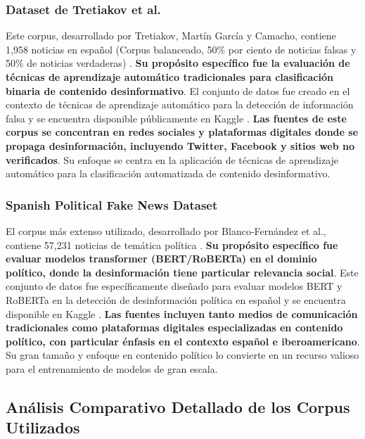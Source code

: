 \subsubsection{Dataset de Tretiakov et al.}

Este corpus, desarrollado por Tretiakov, Martín García y Camacho, contiene 1,958 noticias en español (Corpus balanceado, 50\% por ciento de noticias falsas y 50\% de noticias verdaderas) \cite{tretiakov2022detection}. \textbf{Su propósito específico fue la evaluación de técnicas de aprendizaje automático tradicionales para clasificación binaria de contenido desinformativo}. El conjunto de datos fue creado en el contexto de técnicas de aprendizaje automático para la detección de información falsa y se encuentra disponible públicamente en Kaggle \cite{tretiakov2022noticias}. \textbf{Las fuentes de este corpus se concentran en redes sociales y plataformas digitales donde se propaga desinformación, incluyendo Twitter, Facebook y sitios web no verificados}. Su enfoque se centra en la aplicación de técnicas de aprendizaje automático para la clasificación automatizada de contenido desinformativo.

\subsubsection{Spanish Political Fake News Dataset}

El corpus más extenso utilizado, desarrollado por Blanco-Fernández et al., contiene 57,231 noticias de temática política \cite{blanco2024enhancing}. \textbf{Su propósito específico fue evaluar modelos transformer (BERT/RoBERTa) en el dominio político, donde la desinformación tiene particular relevancia social}. Este conjunto de datos fue específicamente diseñado para evaluar modelos BERT y RoBERTa en la detección de desinformación política en español y se encuentra disponible en Kaggle \cite{blanco2024spanish}. \textbf{Las fuentes incluyen tanto medios de comunicación tradicionales como plataformas digitales especializadas en contenido político, con particular énfasis en el contexto español e iberoamericano}. Su gran tamaño y enfoque en contenido político lo convierte en un recurso valioso para el entrenamiento de modelos de gran escala.

\subsection{Análisis Comparativo Detallado de los Corpus Utilizados}

